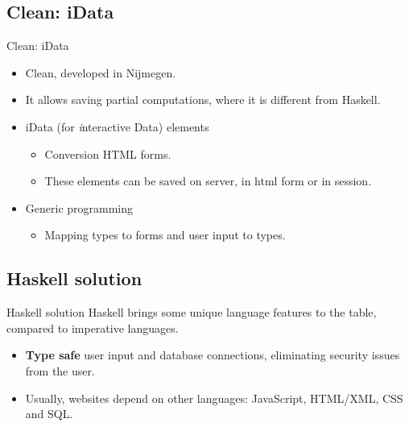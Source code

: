 \documentclass[10pt,usenames,dvipsnames]{beamer}
\begin{document}
	\subsection*{Clean: iData}
	
	\begin{frame}{Clean: iData}
		\begin{itemize}
			\item Clean, developed in Nijmegen.
			\item It allows saving partial computations, where it is different from Haskell.
			\item iData (for \textit{i}nteractive Data) elements
			\begin{itemize}
				\item Conversion HTML forms.
				\item These elements can be saved on server, in html form or in session.
			\end{itemize}
			\item Generic programming
			\begin{itemize}
				\item Mapping types to forms and user input to types.
			\end{itemize} 
		\end{itemize}
	\end{frame}
	
	\subsection*{Haskell solution}
	
	\begin{frame}{Haskell solution}
		Haskell brings some unique language features to the table, compared to imperative languages.
		\begin{itemize}	
			\item \textbf{Type safe} user input and database connections, eliminating security issues from the user.
			\item Usually, websites depend on other languages: JavaScript, HTML/XML, CSS and SQL.
		\end{itemize}
	\end{frame}
\end{document}
